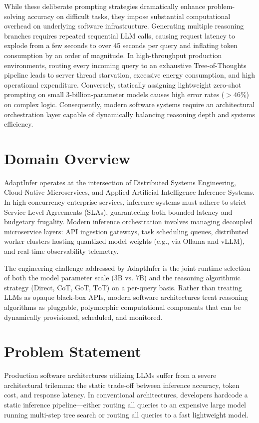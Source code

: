 \documentclass[12pt,a4paper]{report}
\begin{document}
While these deliberate prompting strategies dramatically enhance problem-solving accuracy on difficult tasks, they impose substantial computational overhead on underlying software infrastructure. Generating multiple reasoning branches requires repeated sequential LLM calls, causing request latency to explode from a few seconds to over 45 seconds per query and inflating token consumption by an order of magnitude. In high-throughput production environments, routing every incoming query to an exhaustive Tree-of-Thoughts pipeline leads to server thread starvation, excessive energy consumption, and high operational expenditure. Conversely, statically assigning lightweight zero-shot prompting on small 3-billion-parameter models causes high error rates ($>46\%$) on complex logic. Consequently, modern software systems require an architectural orchestration layer capable of dynamically balancing reasoning depth and systems efficiency.

\section{Domain Overview}
\label{sec:domain_overview}
AdaptInfer operates at the intersection of Distributed Systems Engineering, Cloud-Native Microservices, and Applied Artificial Intelligence Inference Systems. In high-concurrency enterprise services, inference systems must adhere to strict Service Level Agreements (SLAs), guaranteeing both bounded latency and budgetary frugality. Modern inference orchestration involves managing decoupled microservice layers: API ingestion gateways, task scheduling queues, distributed worker clusters hosting quantized model weights (e.g., via Ollama and vLLM), and real-time observability telemetry.

The engineering challenge addressed by AdaptInfer is the joint runtime selection of both the model parameter scale ($3\text{B}$ vs. $7\text{B}$) and the reasoning algorithmic strategy ($\text{Direct}$, $\text{CoT}$, $\text{GoT}$, $\text{ToT}$) on a per-query basis. Rather than treating LLMs as opaque black-box APIs, modern software architectures treat reasoning algorithms as pluggable, polymorphic computational components that can be dynamically provisioned, scheduled, and monitored.

\section{Problem Statement}
\label{sec:problem_statement}
Production software architectures utilizing LLMs suffer from a severe architectural trilemma: the static trade-off between inference accuracy, token cost, and response latency. In conventional architectures, developers hardcode a static inference pipeline—either routing all queries to an expensive large model running multi-step tree search or routing all queries to a fast lightweight model. 
\end{document}
